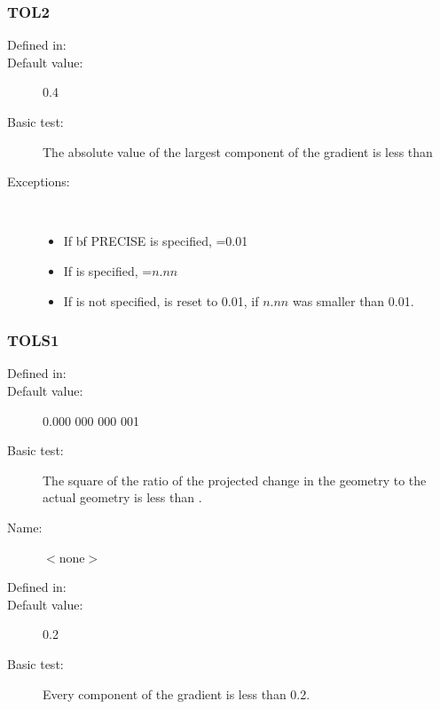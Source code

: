 \subsubsection*{TOL2}
\begin{description}
\item[Defined in:] 
\item[Default value:] 0.4
\item[Basic test:] The absolute value of the largest component of the gradient 
is less than 
\item[Exceptions:]~
\begin{itemize}
\item If {bf PRECISE} is specified, =0.01 
\item If  is specified, =$n.nn$
\item If  is not specified,  is reset to 0.01, if $n.nn$ 
was smaller than 0.01.
\end{itemize}
\end{description}

\subsubsection*{TOLS1}
\begin{description}
\item[Defined in:] 
\item[Default value:] 0.000 000 000 001
\item[Basic test:] The square of the ratio of the projected change in the
geometry to the actual geometry is less than .
\end{description}

\begin{description}
\item[Name: ] $<$none$>$
\item[Defined in:] 
\item[Default value:] 0.2
\item[Basic test:] Every component of the gradient is less than 0.2.
\end{description}
